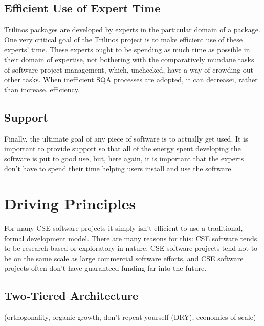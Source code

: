 \documentclass[12pt,relax]{article}
\begin{document}
\subsection{Efficient Use of Expert Time}
Trilinos packages are developed by experts in the particular domain of a
package.  One very critical goal of the Trilinos project is to make efficient
use of these experts' time.  These experts ought to be spending as much time as
possible in their domain of expertise, not bothering with the comparatively
mundane tasks of software project management, which, unchecked, have a way of
crowding out other tasks.  When inefficient SQA processes are adopted, it can 
decreasei, rather than increase, efficiency.

\subsection{Support}
Finally, the ultimate goal of any piece of software is to actually get used.  
It is important to provide support so that all of the energy spent developing
the software is put to good use, but, here again, it is important that the
experts don't have to spend their time helping users install and use the
software.

\clearpage


\section{Driving Principles}
\label{Section:Driving Principles}

For many CSE software projects it simply isn't efficient to use a traditional, 
formal development model.  There are many reasons for this:  CSE software tends
to be research-based or exploratory in nature, CSE software projects tend not
to be on the same scale as large commercial software efforts, and CSE software 
projects often don't have guaranteed funding far into the future.  

\subsection{Two-Tiered Architecture}

(orthogonality, organic growth, don't repeat yourself (DRY), economies of scale)
\end{document}
